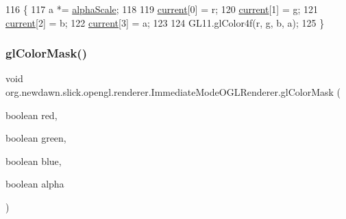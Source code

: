 \begin{DoxyCode}
116                                                               \{
117         a *= \mbox{\hyperlink{classorg_1_1newdawn_1_1slick_1_1opengl_1_1renderer_1_1_immediate_mode_o_g_l_renderer_aa1772629fe3d1481ba6b0688fedcfb23}{alphaScale}};
118         
119         \mbox{\hyperlink{classorg_1_1newdawn_1_1slick_1_1opengl_1_1renderer_1_1_immediate_mode_o_g_l_renderer_a0b726a5c9cde29fd7cff75d8d18af74b}{current}}[0] = r;
120         \mbox{\hyperlink{classorg_1_1newdawn_1_1slick_1_1opengl_1_1renderer_1_1_immediate_mode_o_g_l_renderer_a0b726a5c9cde29fd7cff75d8d18af74b}{current}}[1] = g;
121         \mbox{\hyperlink{classorg_1_1newdawn_1_1slick_1_1opengl_1_1renderer_1_1_immediate_mode_o_g_l_renderer_a0b726a5c9cde29fd7cff75d8d18af74b}{current}}[2] = b;
122         \mbox{\hyperlink{classorg_1_1newdawn_1_1slick_1_1opengl_1_1renderer_1_1_immediate_mode_o_g_l_renderer_a0b726a5c9cde29fd7cff75d8d18af74b}{current}}[3] = a;
123         
124         GL11.glColor4f(r, g, b, a);
125     \}
\end{DoxyCode}
\mbox{\label{classorg_1_1newdawn_1_1slick_1_1opengl_1_1renderer_1_1_immediate_mode_o_g_l_renderer_a451ffce8749614d627ef560ed3988b18}} 
\subsubsection{\texorpdfstring{gl\+Color\+Mask()}{glColorMask()}}
{\footnotesize\ttfamily void org.\+newdawn.\+slick.\+opengl.\+renderer.\+Immediate\+Mode\+O\+G\+L\+Renderer.\+gl\+Color\+Mask (\begin{DoxyParamCaption}\item[{boolean}]{red,  }\item[{boolean}]{green,  }\item[{boolean}]{blue,  }\item[{boolean}]{alpha }\end{DoxyParamCaption})\hspace{0.3cm}{\ttfamily [inline]}}

